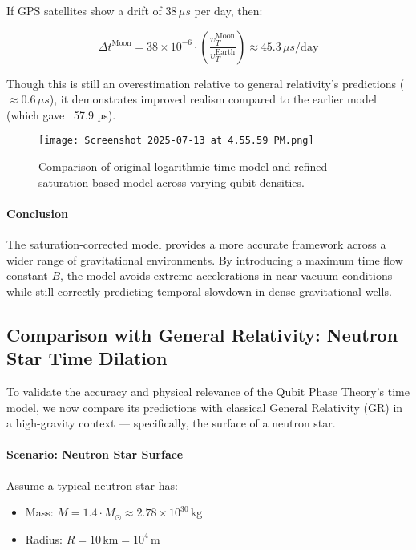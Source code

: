 \documentclass[12pt]{report} %
\begin{document}
If GPS satellites show a drift of \(38 \, \mu s\) per day, then:

\[
\Delta t^{\text{Moon}} = 38 \times 10^{-6} \cdot \left(\frac{v_T^{\text{Moon}}}{v_T^{\text{Earth}}}\right) \approx 45.3 \, \mu s / \text{day}
\]

Though this is still an overestimation relative to general relativity's predictions (\(\approx 0.6 \, \mu s\)), it demonstrates improved realism compared to the earlier model (which gave ~57.9 µs).

\begin{figure}
    \centering
    \texttt{[image: Screenshot 2025-07-13 at 4.55.59 PM.png]}
    \caption{Comparison of original logarithmic time model and refined saturation-based model across varying qubit densities.}
    \label{fig:enter-label}
\end{figure}


\paragraph{Conclusion}

The saturation-corrected model provides a more accurate framework across a wider range of gravitational environments. By introducing a maximum time flow constant \(B\), the model avoids extreme accelerations in near-vacuum conditions while still correctly predicting temporal slowdown in dense gravitational wells.

\subsection{Comparison with General Relativity: Neutron Star Time Dilation}

To validate the accuracy and physical relevance of the Qubit Phase Theory's time model, we now compare its predictions with classical General Relativity (GR) in a high-gravity context — specifically, the surface of a neutron star.

\paragraph{Scenario: Neutron Star Surface}

Assume a typical neutron star has:
\begin{itemize}
  \item Mass: \( M = 1.4 \cdot M_{\odot} \approx 2.78 \times 10^{30} \, \text{kg} \)
  \item Radius: \( R = 10 \, \text{km} = 10^4 \, \text{m} \)
\end{itemize}
\end{document}
